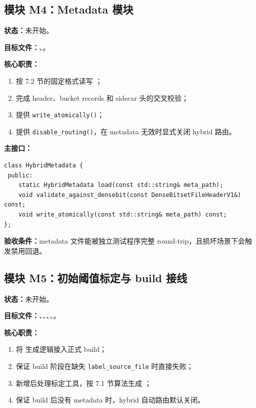 \documentclass[UTF8]{ctexart}
\begin{document}
\subsection{模块 M4：Metadata 模块}
\textbf{状态：}未开始。

\textbf{目标文件：}、。

\textbf{核心职责：}

\begin{enumerate}
\item 按 7.2 节的固定格式读写 ；
\item 完成 header、bucket records 和 sidecar 头的交叉校验；
\item 提供 \texttt{write\_atomically()}；
\item 提供 \texttt{disable\_routing()}，在 metadata 无效时显式关闭 hybrid 路由。
\end{enumerate}

\textbf{主接口：}

\begin{verbatim}
class HybridMetadata {
 public:
	static HybridMetadata load(const std::string& meta_path);
	void validate_against_densebit(const DenseBitsetFileHeaderV1&) const;
	void write_atomically(const std::string& meta_path) const;
};
\end{verbatim}

\textbf{验收条件：}metadata 文件能被独立测试程序完整 round-trip，且损坏场景下会触发禁用回退。

\subsection{模块 M5：初始阈值标定与 build 接线}
\textbf{状态：}未开始。

\textbf{目标文件：}、、、、。

\textbf{核心职责：}

\begin{enumerate}
\item 将  生成逻辑接入正式 build；
\item 保证 build 阶段在缺失 \texttt{label\_source\_file} 时直接失败；
\item 新增后处理标定工具，按 7.1 节算法生成 ；
\item 保证 build 后没有 metadata 时，hybrid 自动路由默认关闭。
\end{enumerate}
\end{document}

